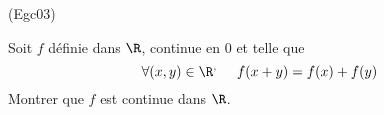 \begin{tiny}(Egc03)\end{tiny} Soit $f$ définie dans $\R$, continue en $0$ et telle que
\begin{displaymath}
 \forall (x,y)\in \R^,\hspace{0.5cm} f(x+y) = f(x) + f(y)
\end{displaymath}
Montrer que $f$ est continue dans $\R$.